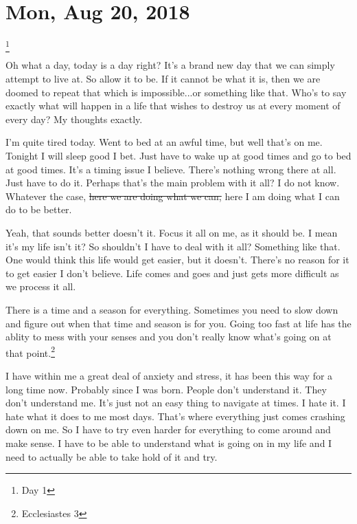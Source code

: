 \section{Mon, Aug 20, 2018}\footnote{Day 1}

Oh what a day, today is a day right? It's a brand new day that we can simply attempt
to live at. So allow it to be. If it cannot be what it is, then we are doomed to
repeat that which is impossible...or something like that. Who's to say exactly what
will happen in a life that wishes to destroy us at every moment of every day? My
thoughts exactly.

I'm quite tired today. Went to bed at an awful time, but well that's on me. Tonight I
will sleep good I bet. Just have to wake up at good times and go to bed at good
times. It's a timing issue I believe. There's nothing wrong there at all. Just have
to do it. Perhaps that's the main problem with it all? I do not know. Whatever the
case, \st{here we are doing what we can,} here I am doing what I can do to be better.

Yeah, that sounds better doesn't it. Focus it all on me, as it should be. I mean it's
my life isn't it? So shouldn't I have to deal with it all? Something like that. One
would think this life would get easier, but it doesn't. There's no reason for it to
get easier I don't believe. Life comes and goes and just gets more difficult as we
process it all.

There is a time and a season for everything. Sometimes you need to slow down and
figure out when that time and season is for you. Going too fast at life has the
ablity to mess with your senses and you don't really know what's going on at that
point.\footnote{Ecclesiastes 3}

I have within me a great deal of anxiety and stress, it has been this way for a long
time now. Probably since I was born. People don't understand it. They don't
understand me. It's just not an easy thing to navigate at times. I hate it. I hate
what it does to me most days. That's where everything just comes crashing down on me.
So I have to try even harder for everything to come around and make sense. I have to
be able to understand what is going on in my life and I need to actually be able to
take hold of it and try.
